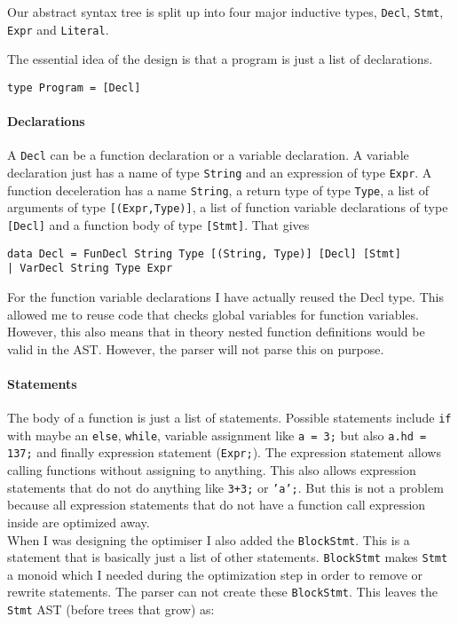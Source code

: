 \documentclass{report}
\begin{document}
Our abstract syntax tree is split up into four major inductive types, \texttt{Decl}, \texttt{Stmt}, \texttt{Expr} and \texttt{Literal}. 

The essential idea of the design is that a program is just a list of declarations. 

\begin{verbatim}
type Program = [Decl]
\end{verbatim}

\paragraph{Declarations} A \texttt{Decl} can be a function declaration or a variable declaration. 
A variable declaration just has a name of type \texttt{String} and an expression of type \texttt{Expr}.
A function deceleration has a name \texttt{String}, a return type of type \texttt{Type}, a list of arguments of type \texttt{[(Expr,Type)]}, a list of function variable declarations of type \texttt{[Decl]} and a function body of type \texttt{[Stmt]}. That gives \begin{verbatim}
data Decl = FunDecl String Type [(String, Type)] [Decl] [Stmt]
| VarDecl String Type Expr\end{verbatim} 
For the function variable declarations I have actually reused the Decl type. This allowed me to reuse code that checks global variables for function variables. However, this also means that in theory nested function definitions would be valid in the AST. However, the parser will not parse this on purpose. 

\paragraph{Statements} The body of a function is just a list of statements. Possible statements include \texttt{if} with maybe an \texttt{else}, \texttt{while}, variable assignment like \texttt{a = 3;} but also \texttt{a.hd = 137;} and finally expression statement (\texttt{Expr;}). The expression statement allows calling functions without assigning to anything. This also allows expression statements that do not do anything like \texttt{3+3;} or \texttt{'a';}. But this is not a problem because all expression statements that do not have a function call expression inside are optimized away.
\\
When I was designing the optimiser I also added the \texttt{BlockStmt}. This is a statement that is basically just a list of other statements. \texttt{BlockStmt} makes \texttt{Stmt} a monoid which I needed during the optimization step in order to remove or rewrite statements. The parser can not create these \texttt{BlockStmt}.
This leaves the \texttt{Stmt} AST (before trees that grow) as: 
\end{document}
